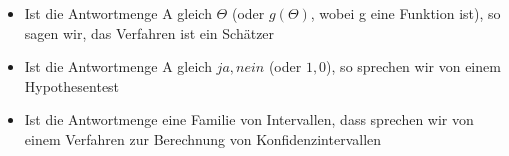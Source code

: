 \documentclass[paper=a4, fontsize=11pt]{scrartcl}
\numberwithin{equation}{section}
\numberwithin{figure}{section}
\numberwithin{table}{section}
\begin{document}
\begin{itemize}
\item Ist die Antwortmenge A gleich $\Theta$ (oder $g(\Theta)$, wobei g eine Funktion ist), so sagen wir, das Verfahren ist ein Schätzer
\item Ist die Antwortmenge A gleich ${ja, nein}$ (oder ${1,0}$), so sprechen wir von einem Hypothesentest
\item Ist die Antwortmenge eine Familie von Intervallen, dass sprechen wir von einem Verfahren zur Berechnung von Konfidenzintervallen
\end{itemize}

\end{document}
